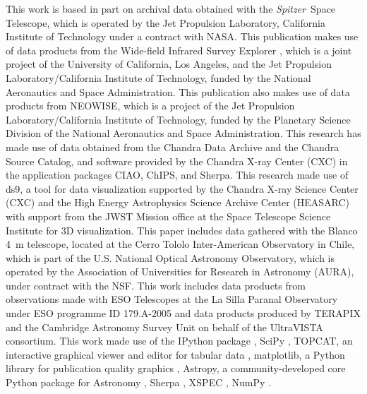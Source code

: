 \documentclass[useAMS,usenatbib,iop,numberedappendix]{mn2e}
\newcommand{\Spitzer}{\emph{Spitzer}}
\begin{document}
This work is based in part on archival data obtained with the \Spitzer\ Space Telescope, which is operated by the Jet Propulsion Laboratory, California Institute of Technology under a contract with NASA.  
This publication makes use of data products from the Wide-field Infrared Survey Explorer \citep{2010AJ....140.1868W}, which is a joint project of the University of California, Los Angeles, and the Jet Propulsion Laboratory/California Institute of Technology, funded by the National Aeronautics and Space Administration. 
This publication also makes use of data products from NEOWISE, which is a project of the Jet Propulsion Laboratory/California Institute of Technology, funded by the Planetary Science Division of the National Aeronautics and Space Administration. 
This research has made use of data obtained from the Chandra Data Archive and the Chandra Source Catalog, and software provided by the Chandra X-ray Center (CXC) in the application packages CIAO, ChIPS, and Sherpa. 
This research made use of ds9, a tool for data visualization supported by the Chandra X-ray Science Center (CXC) and the High Energy Astrophysics Science Archive Center (HEASARC) with support from the JWST Mission office at the Space Telescope Science Institute for 3D visualization. 
This paper includes data gathered with the Blanco 4~m telescope, located at the Cerro Tololo Inter-American Observatory in Chile, which is part of the U.S. National Optical Astronomy Observatory, which is operated by the Association of Universities for Research in Astronomy (AURA), under contract with the NSF.
This work includes data products from observations made with ESO Telescopes at the La Silla Paranal Observatory under ESO programme ID 179.A-2005 and data products produced by TERAPIX and the Cambridge Astronomy Survey Unit on behalf of the UltraVISTA consortium.
This work made use of the IPython package \citep{PER-GRA:2007}, SciPy \citep{jones_scipy_2001}, TOPCAT, an interactive graphical viewer and editor for tabular data \citep{2005ASPC..347...29T}, matplotlib, a Python library for publication quality graphics \citep{Hunter:2007}, Astropy, a community-developed core Python package for Astronomy \citep{2013A&A...558A..33A}, Sherpa \citep{2001SPIE.4477...76F}, XSPEC \citep{1996ASPC..101...17A}, NumPy \citep{van2011numpy}. 




%
%



\end{document}
